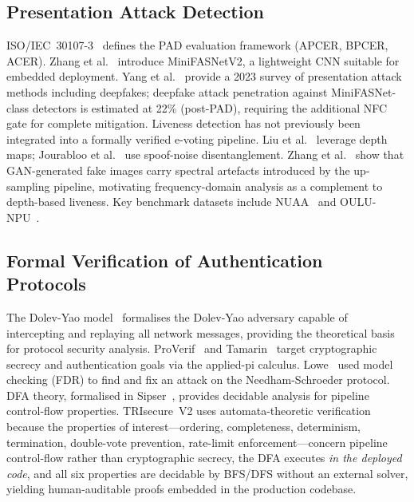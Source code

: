 \documentclass[conference]{IEEEtran}
\begin{document}
\subsection{Presentation Attack Detection}

ISO/IEC~30107-3~\cite{iso30107} defines the PAD evaluation framework
(APCER, BPCER, ACER). Zhang et al.~\cite{zhang2020minifasnet} introduce
MiniFASNetV2, a lightweight CNN suitable for embedded deployment.
Yang et al.~\cite{yang2023pad_survey} provide a 2023 survey of presentation
attack methods including deepfakes; deepfake attack penetration against
MiniFASNet-class detectors is estimated at 22\% (post-PAD), requiring
the additional NFC gate for complete mitigation.
Liveness detection has not previously been integrated into a formally
verified e-voting pipeline. Liu et al.~\cite{liu2018learning} leverage
depth maps; Jourabloo et al.~\cite{jourabloo2018desp} use spoof-noise
disentanglement. Zhang et al.~\cite{zhang2019autoGAN} show that
GAN-generated fake images carry spectral artefacts introduced by the
up-sampling pipeline, motivating frequency-domain analysis as a complement
to depth-based liveness.
Key benchmark datasets include NUAA~\cite{tan2010nuaa}
and OULU-NPU~\cite{boulkenafet2017oulu}.

\subsection{Formal Verification of Authentication Protocols}

The Dolev-Yao model~\cite{dolev1983security} formalises the Dolev-Yao
adversary capable of intercepting and replaying all network messages,
providing the theoretical basis for protocol security analysis.
ProVerif~\cite{blanchet2016proverif} and Tamarin~\cite{meier2013tamarin}
target cryptographic secrecy and authentication goals via the applied-pi
calculus. Lowe~\cite{lowe1996breaking} used model checking (FDR) to find
and fix an attack on the Needham-Schroeder protocol.
DFA theory, formalised in Sipser~\cite{sipser2012introduction},
provides decidable analysis for pipeline control-flow properties.
TRIsecure~V2 uses automata-theoretic verification because the properties
of interest—ordering, completeness, determinism, termination,
double-vote prevention, rate-limit enforcement—concern pipeline control-flow
rather than cryptographic secrecy, the DFA executes \emph{in the deployed
code}, and all six properties are decidable by BFS/DFS without an external
solver, yielding human-auditable proofs embedded in the production codebase.
\end{document}
